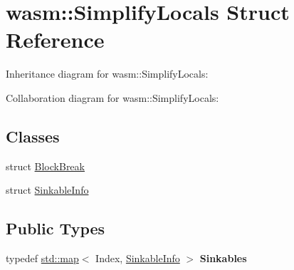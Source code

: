 \hypertarget{structwasm_1_1_simplify_locals}{}\section{wasm\+:\+:Simplify\+Locals Struct Reference}
\label{structwasm_1_1_simplify_locals}


Inheritance diagram for wasm\+:\+:Simplify\+Locals\+:


Collaboration diagram for wasm\+:\+:Simplify\+Locals\+:
\subsection*{Classes}
\begin{DoxyCompactItemize}
\item 
struct \mbox{\hyperlink{structwasm_1_1_simplify_locals_1_1_block_break}{Block\+Break}}
\item 
struct \mbox{\hyperlink{structwasm_1_1_simplify_locals_1_1_sinkable_info}{Sinkable\+Info}}
\end{DoxyCompactItemize}
\subsection*{Public Types}
\begin{DoxyCompactItemize}
\item 
\mbox{\label{structwasm_1_1_simplify_locals_a79766a2542f6af1258e1af4d28216ac7}} 
typedef \mbox{\hyperlink{classstd_1_1map}{std\+::map}}$<$ Index, \mbox{\hyperlink{structwasm_1_1_simplify_locals_1_1_sinkable_info}{Sinkable\+Info}} $>$ {\bfseries Sinkables}
\end{DoxyCompactItemize}
